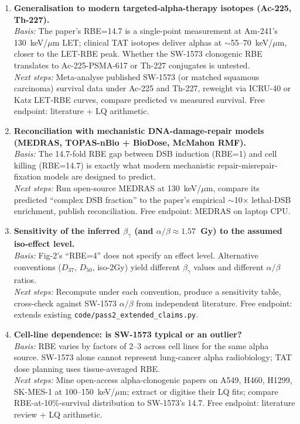 \begin{enumerate}

\item \textbf{Generalisation to modern targeted-alpha-therapy isotopes
      (Ac-225, Th-227).}\\
      \emph{Basis:} The paper's RBE=14.7 is a single-point measurement
      at Am-241's 130~keV/$\mu$m LET; clinical TAT isotopes deliver
      alphas at $\sim$55--70~keV/$\mu$m, closer to the LET-RBE peak.
      Whether the SW-1573 clonogenic RBE translates to Ac-225-PSMA-617
      or Th-227 conjugates is untested.\\
      \emph{Next steps:} Meta-analyse published SW-1573 (or matched
      squamous carcinoma) survival data under Ac-225 and Th-227, reweight
      via ICRU-40 or Katz LET-RBE curves, compare predicted vs measured
      survival. Free endpoint: literature + LQ arithmetic.

\item \textbf{Reconciliation with mechanistic DNA-damage-repair models
      (MEDRAS, TOPAS-nBio + BioDose, McMahon RMF).}\\
      \emph{Basis:} The 14.7-fold RBE gap between DSB induction (RBE=1)
      and cell killing (RBE=14.7) is exactly what modern mechanistic
      repair-misrepair-fixation models are designed to predict.\\
      \emph{Next steps:} Run open-source MEDRAS at 130~keV/$\mu$m,
      compare its predicted ``complex DSB fraction'' to the paper's
      empirical $\sim$10$\times$ lethal-DSB enrichment, publish
      reconciliation. Free endpoint: MEDRAS on laptop CPU.

\item \textbf{Sensitivity of the inferred $\beta_\gamma$ (and $\alpha/\beta
      \approx 1.57$~Gy) to the assumed iso-effect level.}\\
      \emph{Basis:} Fig-2's ``RBE=4'' does not specify an effect level.
      Alternative conventions ($D_{37}$, $D_{50}$, iso-2Gy) yield
      different $\beta_\gamma$ values and different $\alpha/\beta$ ratios.\\
      \emph{Next steps:} Recompute under each convention, produce a
      sensitivity table, cross-check against SW-1573 $\alpha/\beta$ from
      independent literature. Free endpoint: extends existing
      \texttt{code/pass2\_extended\_claims.py}.

\item \textbf{Cell-line dependence: is SW-1573 typical or an outlier?}\\
      \emph{Basis:} RBE varies by factors of 2--3 across cell lines for
      the same alpha source. SW-1573 alone cannot represent lung-cancer
      alpha radiobiology; TAT dose planning uses tissue-averaged RBE.\\
      \emph{Next steps:} Mine open-access alpha-clonogenic papers on
      A549, H460, H1299, SK-MES-1 at 100--150~keV/$\mu$m; extract or
      digitise their LQ fits; compare RBE-at-10\%-survival distribution
      to SW-1573's 14.7. Free endpoint: literature review + LQ
      arithmetic.


\end{enumerate}
